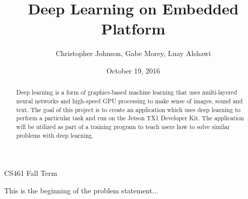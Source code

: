 \documentclass[letterpaper,10pt]{article}
\author{Christopher Johnson, Gabe Morey, Luay Alshawi}
\title{Deep Learning on Embedded Platform}
\date{October 19, 2016}
\begin{document}
\begin{titlingpage}
\maketitle
CS461 Fall Term
\begin{abstract}
Deep learning is a form of graphics-based machine learning that uses multi-layered neural networks and high-speed GPU processing to make sense of images, sound and text. The goal of this project is to create an application which uses deep learning to perform a particular task and run on the Jetson TX1 Developer Kit. The application will be utilized as part of a training program to teach users how to solve similar problems with deep learning.
\end{abstract}
\end{titlingpage}


This is the beginning of the problem statement...
\end{document}

